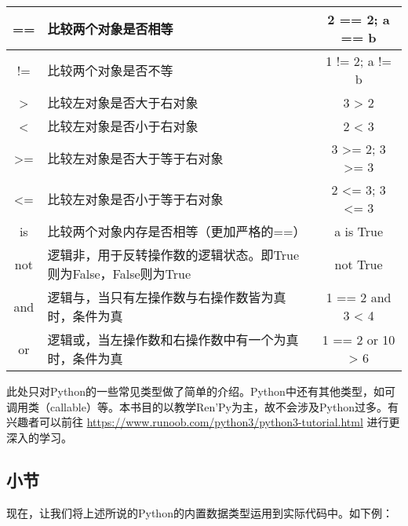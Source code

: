 \begin{center}
    \tabletail{\hline}
    \tablelasttail{\hline}
    \label{table:4.1.5}
    \begin{supertabular}{|c|p{8cm}|c|}
        \hline
        == & 比较两个对象是否相等 & 2 == 2; a == b\\
        \hline
        != & 比较两个对象是否不等 & 1 != 2; a != b\\
        \hline
        > & 比较左对象是否大于右对象 & 3 > 2\\
        \hline
        < & 比较左对象是否小于右对象 & 2 < 3\\
        \hline
        >= & 比较左对象是否大于等于右对象 & 3 >= 2; 3 >= 3\\
        \hline
        <= & 比较左对象是否小于等于右对象 & 2 <= 3; 3 <= 3\\
        \hline
        is & 比较两个对象内存是否相等（更加严格的==）& a is True\\
        \hline
        not & 逻辑非，用于反转操作数的逻辑状态。即True则为False，False则为True & not True\\
        \hline
        and & 逻辑与，当只有左操作数与右操作数皆为真时，条件为真 & 1 == 2 and 3 < 4\\
        \hline
        or & 逻辑或，当左操作数和右操作数中有一个为真时，条件为真 & 1 == 2 or 10 > 6\\
        \hline
    \end{supertabular}
\end{center}

\begin{ExtraKnowledge}
    此处只对Python的一些常见类型做了简单的介绍。Python中还有其他类型，如可调用类（callable）等。本书目的以教学Ren'Py为主，故不会涉及Python过多。有兴趣者可以前往 \url{https://www.runoob.com/python3/python3-tutorial.html} 进行更深入的学习。
\end{ExtraKnowledge}

\subsection{小节}
现在，让我们将上述所说的Python的内置数据类型运用到实际代码中。如下例：

